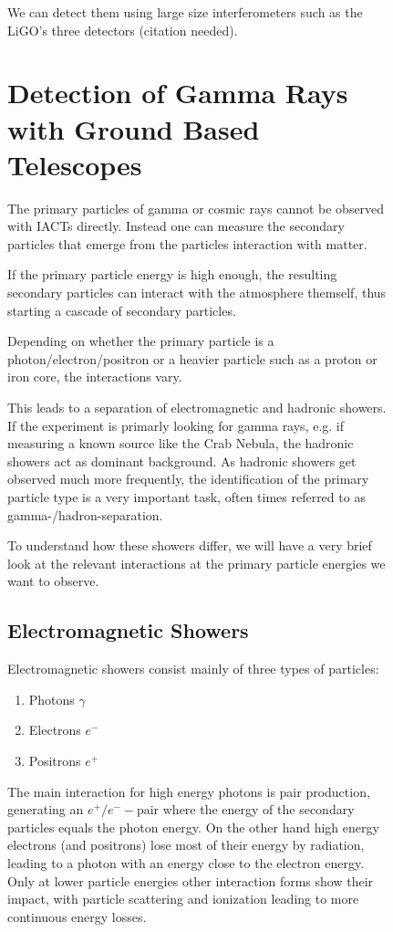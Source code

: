 \begin{figure}
We can detect them using large size interferometers such as
the LiGO's three detectors (citation needed).
\fi

\section{Detection of Gamma Rays with Ground Based Telescopes}
The primary particles of gamma or cosmic rays cannot be 
observed with IACTs directly. Instead one can measure the secondary particles
that emerge from the particles interaction with matter.

If the primary particle energy is high enough, the resulting 
secondary
particles can interact with the atmosphere themself, thus starting a 
cascade of secondary particles.

Depending on whether the primary particle is 
a photon/electron/positron or a heavier particle such as a proton 
or iron core, the interactions vary.

This leads to a separation of electromagnetic and hadronic showers.
If the experiment is primarly looking for 
gamma rays, e.g. if measuring a known source like the Crab Nebula, 
the hadronic showers act as dominant background.
As hadronic showers get observed much more frequently, 
the identification of the primary particle type is a very important 
task, often times referred to as gamma-/hadron-separation.

To understand how these showers differ, we will have a very brief look
at the relevant interactions at the primary particle energies
we want to observe.

\subsection{Electromagnetic Showers}
Electromagnetic showers consist mainly of three types of particles:
\begin{enumerate}
	\item{Photons $\gamma$}
	\item{Electrons $e^-$}
	\item{Positrons $e^+$}
\end{enumerate}

The main interaction for high energy photons is pair 
production, generating an $e^+/e^--$pair where the energy of 
the secondary particles equals the photon energy.
On the other hand high energy electrons (and positrons) lose 
most of their energy by radiation, leading to a photon with 
an energy close to the electron energy.
Only at lower particle energies other interaction forms show their impact,
with particle scattering and ionization 
leading to more continuous energy losses.


\end{figure}
